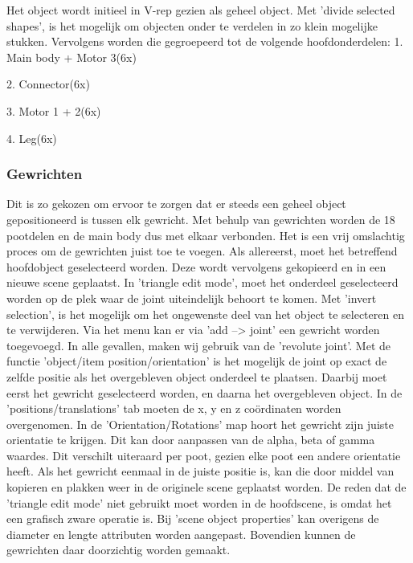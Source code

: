 \documentclass[10pt,a4paper]{article}
\begin{document}
Het object wordt initieel in V-rep gezien als geheel object. Met 'divide selected shapes', is het mogelijk om objecten onder te verdelen in zo klein mogelijke stukken. Vervolgens worden die gegroepeerd tot de volgende hoofdonderdelen:
1. Main body + Motor 3(6x)

2. Connector(6x)

3. Motor 1 + 2(6x)

4. Leg(6x)
\subsubsection{Gewrichten}
Dit is zo gekozen om ervoor te zorgen dat er steeds een geheel object gepositioneerd is tussen elk gewricht. Met behulp van gewrichten worden de 18 pootdelen en de main body dus met elkaar verbonden. Het is een vrij omslachtig proces om de gewrichten juist toe te voegen. Als allereerst, moet het betreffend hoofdobject geselecteerd worden. Deze wordt vervolgens gekopieerd en in een nieuwe scene geplaatst. In 'triangle edit mode', moet het onderdeel geselecteerd worden op de plek waar de joint uiteindelijk behoort te komen. Met 'invert selection', is het mogelijk om het ongewenste deel van het object te selecteren en te verwijderen. Via het menu kan er via 'add --> joint' een gewricht worden toegevoegd. In alle gevallen, maken wij gebruik van de 'revolute joint'. Met de functie 'object/item position/orientation' is het mogelijk de joint op exact de zelfde positie als het overgebleven object onderdeel te plaatsen. Daarbij moet eerst het gewricht geselecteerd worden, en daarna het overgebleven object. In de 'positions/translations' tab moeten de x, y en z co\"ordinaten worden overgenomen. In de 'Orientation/Rotations' map hoort het gewricht zijn juiste orientatie te krijgen. Dit kan door aanpassen van de alpha, beta of gamma waardes. Dit verschilt uiteraard per poot, gezien elke poot een andere orientatie heeft. Als het gewricht eenmaal in de juiste positie is, kan die door middel van kopieren en plakken weer in de originele scene geplaatst worden. De reden dat de 'triangle edit mode' niet gebruikt moet worden in de hoofdscene, is omdat het een grafisch zware operatie is. Bij 'scene object properties' kan overigens de diameter en lengte attributen worden aangepast. Bovendien kunnen de gewrichten daar doorzichtig worden gemaakt.
\end{document}
